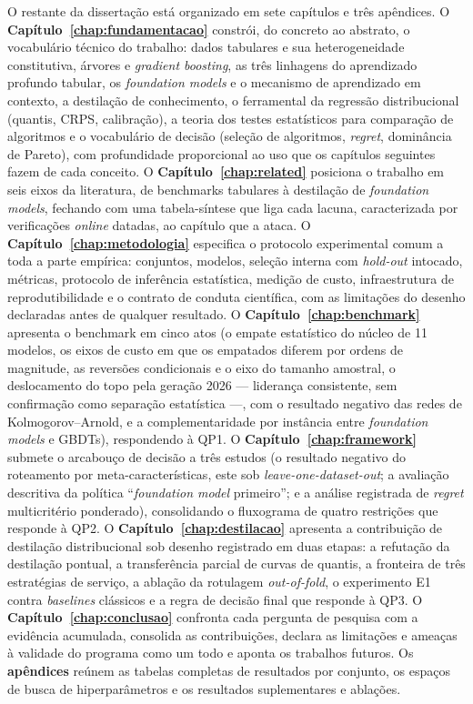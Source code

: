 O restante da dissertação está organizado em sete capítulos e três
apêndices. O \textbf{Capítulo~\ref{chap:fundamentacao}} constrói, do
concreto ao abstrato, o vocabulário técnico do trabalho: dados tabulares e
sua heterogeneidade constitutiva, árvores e \emph{gradient boosting}, as
três linhagens do aprendizado profundo tabular, os \emph{foundation
models} e o mecanismo de aprendizado em contexto, a destilação de
conhecimento, o ferramental da regressão distribucional (quantis, CRPS,
calibração), a teoria dos testes estatísticos para comparação de
algoritmos e o vocabulário de decisão (seleção de algoritmos,
\emph{regret}, dominância de Pareto), com profundidade proporcional
ao uso que os capítulos seguintes fazem de cada conceito. O \textbf{Capítulo~\ref{chap:related}} posiciona o trabalho
em seis eixos da literatura, de benchmarks tabulares à destilação de
\emph{foundation models}, fechando com uma tabela-síntese que liga cada
lacuna, caracterizada por verificações \emph{online} datadas, ao capítulo
que a ataca. O \textbf{Capítulo~\ref{chap:metodologia}} especifica o
protocolo experimental comum a toda a parte empírica: conjuntos, modelos,
seleção interna com \emph{hold-out} intocado, métricas,
protocolo de inferência estatística, medição de custo, infraestrutura de
reprodutibilidade e o contrato de conduta científica, com as limitações do
desenho declaradas antes de qualquer resultado. O
\textbf{Capítulo~\ref{chap:benchmark}} apresenta o benchmark em cinco
atos (o empate estatístico do núcleo de 11 modelos, os eixos de custo
em que os empatados diferem por ordens de magnitude, as reversões
condicionais e o eixo do tamanho amostral, o deslocamento do topo
pela geração 2026 --- liderança consistente, sem confirmação como
separação estatística ---, com o resultado negativo das redes de
Kolmogorov--Arnold,
e a complementaridade por instância entre \emph{foundation models} e
GBDTs), respondendo à QP1. O \textbf{Capítulo~\ref{chap:framework}} submete o
arcabouço de decisão a três estudos (o resultado negativo do
roteamento por meta-características, este sob
\emph{leave-one-dataset-out}; a avaliação descritiva da política
``\emph{foundation model}
primeiro''; e a análise registrada de \emph{regret} multicritério
ponderado), consolidando o fluxograma de quatro restrições que responde
à QP2. O \textbf{Capítulo~\ref{chap:destilacao}} apresenta a contribuição
de destilação distribucional sob desenho registrado em duas etapas: a refutação da
destilação pontual, a transferência parcial de curvas de quantis, a
fronteira de três estratégias de serviço, a ablação da rotulagem
\emph{out-of-fold}, o experimento E1 contra \emph{baselines} clássicos e a
regra de decisão final que responde à QP3. O
\textbf{Capítulo~\ref{chap:conclusao}} confronta cada pergunta de pesquisa
com a evidência acumulada, consolida as contribuições, declara as
limitações e ameaças à validade do programa como um todo e aponta os
trabalhos futuros. Os \textbf{apêndices} reúnem as tabelas completas de
resultados por conjunto, os espaços de busca de hiperparâmetros e os
resultados suplementares e ablações.
